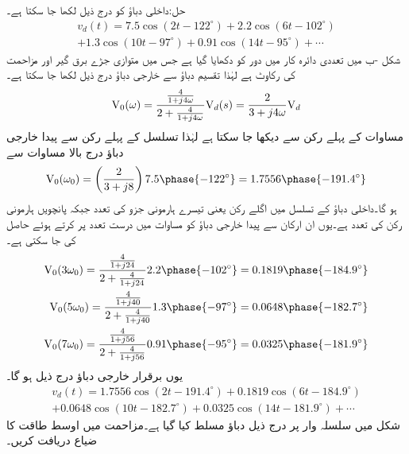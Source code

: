 حل:داخلی دباؤ کو درج ذیل لکھا جا سکتا ہے۔
 \begin{multline}\label{مساوات_فوریئر_لاگو_دباو_الف}
v_d(t)=7.5\cos(2t-122^{\circ})+2.2\cos(6t-102^{\circ})\\
+1.3\cos(10t-97^{\circ})+0.91\cos(14t-95^{\circ})+\cdots
\end{multline}
شکل -ب میں تعددی دائرہ کار میں دور کو دکھایا گیا ہے جس میں متوازی جڑے برق گیر اور مزاحمت کی
 رکاوٹ  ہے  لہٰذا تقسیم دباؤ سے خارجی دباؤ درج ذیل لکھا جا سکتا ہے۔
\begin{align}\label{مساوات_فوریئر_لاگو_دباو_ب}
{\ensuremath{{\textup{V}}}}_0(\omega)=\frac{\frac{4}{1+j4\omega}}{2+\frac{4}{1+j4\omega}} {{\textup{V}}}_d(s)=\frac{2}{3+j4\omega} {{\textup{V}}}_d
\end{align}
مساوات  کے پہلے رکن سے   دیکھا جا سکتا ہے لہٰذا تسلسل کے پہلے رکن سے پیدا خارجی دباؤ درج بالا مساوات سے
\begin{align*}
\bV_0(\omega_0)=\left(\frac{2}{3+j8}\right) 7.5\phase{-122^{\circ}} =1.7556\phase{-191.4^{\circ}}
\end{align*}
ہو گا۔داخلی دباؤ کے تسلسل میں اگلے رکن یعنی تیسرے ہارمونی جزو کی تعدد  جبکہ  پانچویں ہارمونی رکن کی تعدد  ہے۔یوں ان ارکان سے پیدا خارجی دباؤ کو مساوات  میں درست تعدد پر کرتے ہوئے حاصل کی جا سکتی ہے۔
\begin{align*}
\bV_0(3\omega_0)=\frac{\frac{4}{1+j24}}{2+\frac{4}{1+j24}} 2.2\phase{-102^{\circ}}=0.1819\phase{-184.9^{\circ}}\\
\bV_0(5\omega_0)=\frac{\frac{4}{1+j40}}{2+\frac{4}{1+j40}} 1.3\phase{-97^{\circ}}=0.0648\phase{-182.7^{\circ}}\\
\bV_0(7\omega_0)=\frac{\frac{4}{1+j56}}{2+\frac{4}{1+j56}} 0.91\phase{-95^{\circ}}=0.0325\phase{-181.9^{\circ}}
\end{align*}
یوں برقرار خارجی دباؤ درج ذیل ہو گا۔
 \begin{multline}
v_d(t)=1.7556\cos(2t-191.4^{\circ})+0.1819\cos(6t-184.9^{\circ})\\
+0.0648\cos(10t-182.7^{\circ})+0.0325\cos(14t-181.9^{\circ})+\cdots
\end{multline}
شکل  میں سلسلہ وار  پر درج ذیل دباؤ  مسلط کیا گیا ہے۔مزاحمت میں اوسط طاقت کا ضیاع دریافت کریں۔
